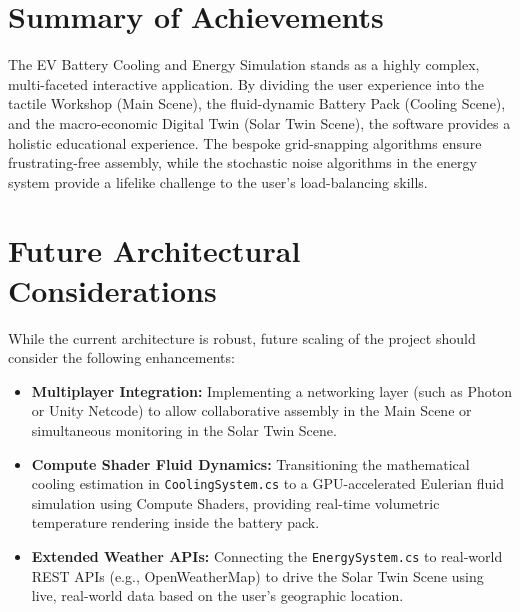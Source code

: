 \documentclass[12pt,a4paper,oneside]{report}
\begin{document}
\section{Summary of Achievements}
The EV Battery Cooling and Energy Simulation stands as a highly complex, multi-faceted interactive application. By dividing the user experience into the tactile Workshop (Main Scene), the fluid-dynamic Battery Pack (Cooling Scene), and the macro-economic Digital Twin (Solar Twin Scene), the software provides a holistic educational experience. The bespoke grid-snapping algorithms ensure frustrating-free assembly, while the stochastic noise algorithms in the energy system provide a lifelike challenge to the user's load-balancing skills.

\section{Future Architectural Considerations}
While the current architecture is robust, future scaling of the project should consider the following enhancements:
\begin{itemize}
    \item \textbf{Multiplayer Integration:} Implementing a networking layer (such as Photon or Unity Netcode) to allow collaborative assembly in the Main Scene or simultaneous monitoring in the Solar Twin Scene.
    \item \textbf{Compute Shader Fluid Dynamics:} Transitioning the mathematical cooling estimation in \texttt{CoolingSystem.cs} to a GPU-accelerated Eulerian fluid simulation using Compute Shaders, providing real-time volumetric temperature rendering inside the battery pack.
    \item \textbf{Extended Weather APIs:} Connecting the \texttt{EnergySystem.cs} to real-world REST APIs (e.g., OpenWeatherMap) to drive the Solar Twin Scene using live, real-world data based on the user's geographic location.
\end{itemize}
\end{document}
